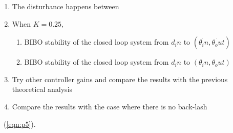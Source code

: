 \begin{enumerate}
  \item The disturbance happens between 
  \item When $K=0.25$,
  \begin{enumerate}
  \item BIBO stability of the closed loop system from $d_in$ to $(\dot{\theta_in},\dot{\theta_out})$ 
  \item BIBO stability of the closed loop system from $d_in$ to $(\theta_in,\theta_out)$
  \end{enumerate}
  \item Try other controller gains and compare the results with the previous theoretical analysis
  \item Compare the results with the case where there is no back-lash
\end{enumerate}




~(\ref{eqn:p5}).
